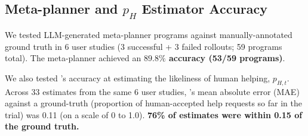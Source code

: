 \begin{table}
\caption{Computed Best Task Allocation (and Agent Q-values) During a Sim Trial on Task 1.}
\label{tab:sim-alloc-switch}
\centering
{}
\end{table}

\subsection{Meta-planner and $p_{H}$ Estimator Accuracy}
We tested LLM-generated meta-planner programs against manually-annotated ground truth in 6 user studies (3 successful + 3 failed rollouts; 59 programs total). The meta-planner achieved an \textbf{$\mathbf{89.8\%}$ accuracy (53/59 programs)}.

We also tested \ours{}'s accuracy at estimating the likeliness of human helping, $p_{H, t}$. Across 33 estimates from the same 6 user studies, \ours{}'s mean absolute error (MAE) against a ground-truth (proportion of human-accepted help requests so far in the trial) was 0.11 (on a scale of 0 to 1.0). \textbf{76\% of estimates were within 0.15 of the ground truth.}

